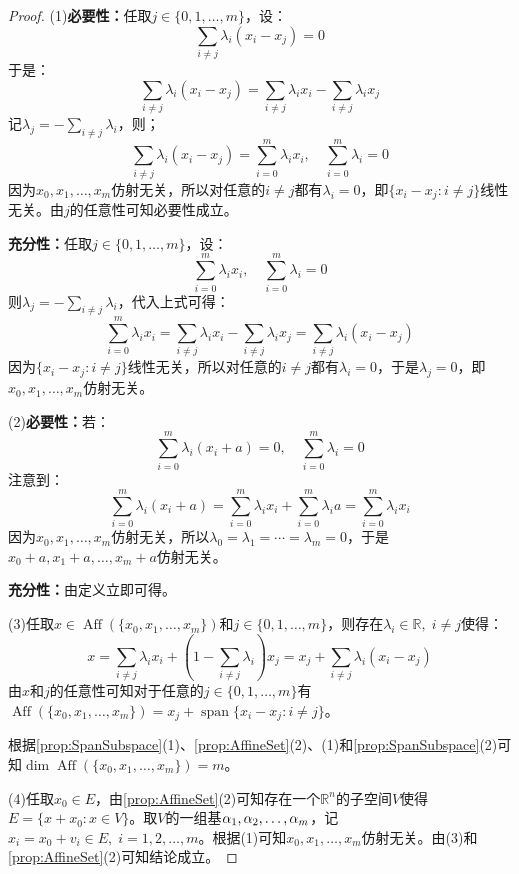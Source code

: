 \begin{proof}
	(1)\textbf{必要性：}任取$j\in\{0,1,\dots,m\}$，设：
	\begin{equation*}
		\sum_{i\ne j}\lambda_i(x_i-x_j)=0
	\end{equation*}
	于是：
	\begin{equation*}
		\sum_{i\ne j}\lambda_i(x_i-x_j)=\sum_{i\ne j}\lambda_ix_i-\sum_{i\ne j}\lambda_ix_j
	\end{equation*}
	记$\lambda_j=-\sum\limits_{i\ne j}\lambda_i$，则；
	\begin{equation*}
		\sum_{i\ne j}\lambda_i(x_i-x_j)=\sum_{i=0}^{m}\lambda_ix_i,\quad\sum_{i=0}^{m}\lambda_i=0
	\end{equation*}
	因为$x_0,x_1,\dots,x_m$仿射无关，所以对任意的$i\ne j$都有$\lambda_i=0$，即$\{x_i-x_j:i\neq j\}$线性无关。由$j$的任意性可知必要性成立。\par
	\textbf{充分性：}任取$j\in\{0,1,\dots,m\}$，设：
	\begin{equation*}
		\sum_{i=0}^{m}\lambda_ix_i,\quad\sum_{i=0}^{m}\lambda_i=0
	\end{equation*}
	则$\lambda_j=-\sum\limits_{i\ne j}\lambda_i$，代入上式可得：
	\begin{equation*}
		\sum_{i=0}^{m}\lambda_ix_i=\sum_{i\ne j}\lambda_ix_i-\sum_{i\ne j}\lambda_ix_j=\sum_{i\ne j}^{}\lambda_i(x_i-x_j)
	\end{equation*}
	因为$\{x_i-x_j:i\ne j\}$线性无关，所以对任意的$i\ne j$都有$\lambda_i=0$，于是$\lambda_j=0$，即$x_0,x_1,\dots,x_m$仿射无关。\par
	(2)\textbf{必要性：}若：
	\begin{equation*}
		\sum_{i=0}^{m}\lambda_i(x_i+a)=0,\quad\sum_{i=0}^{m}\lambda_i=0
	\end{equation*}
	注意到：
	\begin{equation*}
		\sum_{i=0}^{m}\lambda_i(x_i+a)=\sum_{i=0}^{m}\lambda_ix_i+\sum_{i=0}^{m}\lambda_ia=\sum_{i=0}^{m}\lambda_ix_i
	\end{equation*}
	因为$x_0,x_1,\dots,x_m$仿射无关，所以$\lambda_0=\lambda_1=\cdots=\lambda_m=0$，于是$x_0+a,x_1+a,\dots,x_m+a$仿射无关。\par
	\textbf{充分性：}由定义立即可得。\par
	(3)任取$x\in\operatorname{Aff}(\{x_0,x_1,\dots,x_m\})$和$j\in\{0,1,\dots,m\}$，则存在$\lambda_i\in\mathbb{R},\;i\ne j$使得：
	\begin{equation*}
		x=\sum_{i\ne j}\lambda_ix_i+\left(1-\sum_{i\ne j}\lambda_i\right)x_j=x_j+\sum_{i\ne j}\lambda_i(x_i-x_j)
	\end{equation*}
	由$x$和$j$的任意性可知对于任意的$j\in\{0,1,\dots,m\}$有$\operatorname{Aff}(\{x_0,x_1,\dots,x_m\})=x_j+\operatorname{span}\{x_i-x_j:i\ne j\}$。\par
	根据\cref{prop:SpanSubspace}(1)、\cref{prop:AffineSet}(2)、(1)和\cref{prop:SpanSubspace}(2)可知$\dim\operatorname{Aff}(\{x_0,x_1,\dots,x_m\})=m$。\par
	(4)任取$x_0\in E$，由\cref{prop:AffineSet}(2)可知存在一个$\mathbb{R}^{n}$的子空间$V$使得$E=\{x+x_0:x\in V\}$。取$V$的一组基$\alpha_1, \alpha_2, \dots, \alpha_{m}$，记$x_i=x_0+v_i\in E,\;i=1,2,\dots,m$。根据(1)可知$x_0,x_1,\dots,x_m$仿射无关。由(3)和\cref{prop:AffineSet}(2)可知结论成立。
\end{proof}
